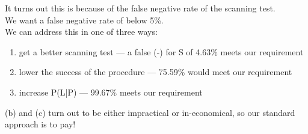 \documentclass[../../lecture_notes.tex]{subfiles}
\begin{document}
It turns out this is because of the false negative rate of the scanning test.\\
We want a false negative rate of below 5\%.\\
We can address this in one of three ways:
	\begin{enumerate} [itemsep=0mm]
		\item get a better scanning test — a false (-) for S of 4.63\% meets our requirement
		\item lower the success of the procedure — 75.59\% would meet our requirement
		\item increase P(L|P) — 99.67\% meets our requirement
	\end{enumerate}
	(b) and (c) turn out to be either impractical or in-economical, so our standard approach is to pay!
\end{document}
